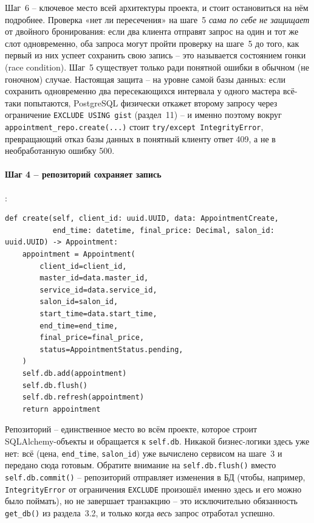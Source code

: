 Шаг~6 -- ключевое место всей архитектуры проекта, и стоит остановиться на
нём подробнее. Проверка «нет ли пересечения» на шаге~5 \emph{сама по себе
не защищает} от двойного бронирования: если два клиента отправят запрос
на один и тот же слот одновременно, оба запроса могут пройти проверку на
шаге~5 до того, как первый из них успеет сохранить свою запись -- это
называется состоянием гонки (race condition). Шаг~5 существует только
ради понятной ошибки в обычном (не гоночном) случае. Настоящая защита --
на уровне самой базы данных: если сохранить одновременно два
пересекающихся интервала у одного мастера всё-таки попытаются, PostgreSQL
физически откажет второму запросу через ограничение
\texttt{EXCLUDE USING gist} (раздел~11) -- и именно поэтому вокруг
\texttt{appointment_repo.create(...)} стоит \texttt{try/except
IntegrityError}, превращающий отказ базы данных в понятный клиенту ответ
409, а не в необработанную ошибку 500.

\paragraph{Шаг 4 -- репозиторий сохраняет запись}
:

\begin{verbatim}
def create(self, client_id: uuid.UUID, data: AppointmentCreate,
           end_time: datetime, final_price: Decimal, salon_id: uuid.UUID) -> Appointment:
    appointment = Appointment(
        client_id=client_id,
        master_id=data.master_id,
        service_id=data.service_id,
        salon_id=salon_id,
        start_time=data.start_time,
        end_time=end_time,
        final_price=final_price,
        status=AppointmentStatus.pending,
    )
    self.db.add(appointment)
    self.db.flush()
    self.db.refresh(appointment)
    return appointment
\end{verbatim}

Репозиторий -- единственное место во всём проекте, которое строит
SQLAlchemy-объекты и обращается к \texttt{self.db}. Никакой бизнес-логики
здесь уже нет: всё (цена, \texttt{end_time}, \texttt{salon_id}) уже
вычислено сервисом на шаге~3 и передано сюда готовым. Обратите внимание
на \texttt{self.db.flush()} вместо \texttt{self.db.commit()} -- репозиторий
отправляет изменения в БД (чтобы, например, \texttt{IntegrityError} от
ограничения \texttt{EXCLUDE} произошёл именно здесь и его можно было
поймать), но не завершает транзакцию -- это исключительно обязанность
\texttt{get_db()} из раздела~3.2, и только когда \emph{весь} запрос
отработал успешно.

